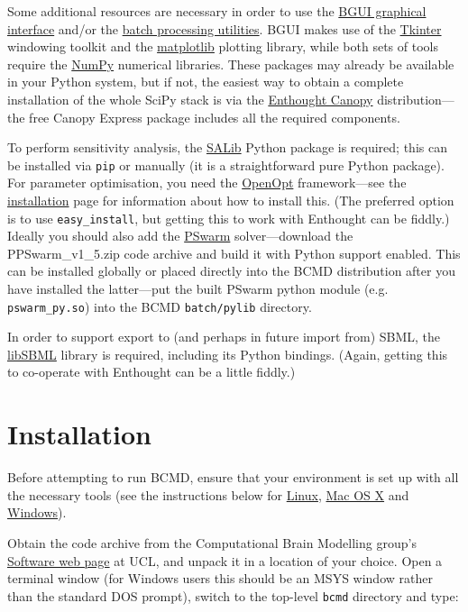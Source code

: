 \documentclass[a4paper,11pt]{article}
\begin{document}
Some additional resources are necessary in order to use the \hyperref[bgui]{BGUI graphical interface} and/or the \hyperref[batch]{batch processing utilities}. BGUI makes use of the \href{https://wiki.python.org/moin/TkInter}{Tkinter} windowing toolkit and the \href{http://matplotlib.org}{matplotlib} plotting library, while both sets of tools require the \href{http://www.numpy.org}{NumPy} numerical libraries. These packages may already be available in your Python system, but if not, the easiest way to obtain a complete installation of the whole SciPy stack is via the \href{https://www.enthought.com/products/canopy/}{Enthought Canopy} distribution---the free Canopy Express package includes all the required components.

To perform sensitivity analysis, the \href{http://jdherman.github.io/SALib/}{SALib} Python package is required; this can be installed via \texttt{pip} or manually (it is a straightforward pure Python package). For parameter optimisation, you need the \href{http://openopt.org/}{OpenOpt} framework---see the \href{http://openopt.org/install}{installation} page for information about how to install this. (The preferred option is to use \texttt{easy\_install}, but getting this to work with Enthought can be fiddly.) Ideally you should also add the \href{http://www.norg.uminho.pt/aivaz/pswarm/}{PSwarm} solver---download the PPSwarm\_v1\_5.zip code archive and build it with Python support enabled. This can be installed globally or placed directly into the BCMD distribution after you have installed the latter---put the built PSwarm python module (e.g. \texttt{pswarm\_py.so}) into the BCMD \texttt{batch/pylib} directory.

In order to support export to (and perhaps in future import from) SBML, the \href{http://sbml.org/Software/libSBML}{libSBML} library \citep{Bornstein:2008id} is required, including its Python bindings. (Again, getting this to co-operate with Enthought can be a little fiddly.)


\section{Installation}\label{install}

Before attempting to run BCMD, ensure that your environment is set up with all the necessary tools (see the instructions below for \hyperref[linux]{Linux}, \hyperref[osx]{Mac OS X} and \hyperref[win]{Windows}).

Obtain the code archive from the Computational Brain Modelling group's \href{https://www.ucl.ac.uk/medphys/research/borl/nirs/mms/computational-brain-modelling/software}{Software web page} at UCL, and unpack it in a location of your choice. Open a terminal window (for Windows users this should be an MSYS window rather than the standard DOS prompt), switch to the top-level \texttt{bcmd} directory and type:
\end{document}
